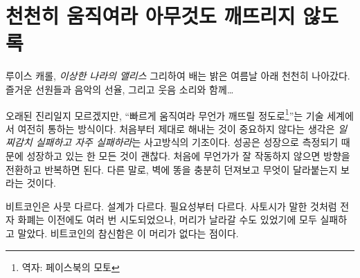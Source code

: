 \chapter{천천히 움직여라 아무것도 깨뜨리지 않도록}
\label{les:18}

\begin{chapquote}{루이스 캐롤, \textit{이상한 나라의 앨리스}}
	그리하여 배는 밝은 여름날 아래 천천히 나아갔다. 즐거운 선원들과 음악의 선율, 그리고 웃음 소리와 함께\ldots
\end{chapquote}

\begin{comment}
	It might be a dead mantra, but \enquote{move fast and break things} is still how
	much of the tech world operates. The idea that it doesn't matter if you
	get things right the first time is a basic pillar of the \textit{fail early,
		fail often} mentality. Success is measured in growth, so as long as you
	are growing everything is fine. If something doesn't work at first you
	simply pivot and iterate. In other words: throw enough shit against the
	wall and see what sticks.
\end{comment}
오래된 진리일지 모르겠지만, \enquote{빠르게 움직여라 무언가 깨뜨릴 정도로\footnote{역자: 페이스북의 모토}}는 기술 세계에서 여전히 통하는 방식이다.
처음부터 제대로 해내는 것이 중요하지 않다는 생각은 \textit{일찌감치 실패하고 자주 실패하라}는 사고방식의 기조이다.
성공은 성장으로 측정되기 때문에 성장하고 있는 한 모든 것이 괜찮다. 
처음에 무언가가 잘 작동하지 않으면 방향을 전환하고 반복하면 된다. 
다른 말로, 벽에 똥을 충분히 던져보고 무엇이 달라붙는지 보라는 것이다.

\begin{comment}
	Bitcoin is very different. It is different by design. It is different
	out of necessity. As Satoshi pointed out, e-currency has been tried
	many times before, and all previous attempts have failed because there
	was a head which could be cut off. The novelty of Bitcoin is that it is
	a beast without heads.
\end{comment}
비트코인은 사뭇 다르다. 설계가 다르다. 필요성부터 다르다.
사토시가 말한 것처럼 전자 화폐는 이전에도 여러 번 시도되었으나, 머리가 날라갈 수도 있었기에 모두 실패하고 말았다.
비트코인의 참신함은 이 머리가 없다는 점이다.

